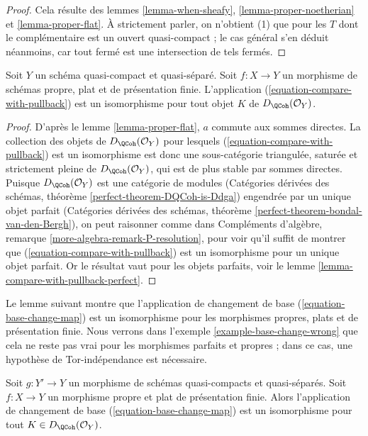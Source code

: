 \begin{proof}
Cela résulte des lemmes \ref{lemma-when-sheafy}, \ref{lemma-proper-noetherian} et \ref{lemma-proper-flat}. À strictement parler, on n'obtient (1) que pour les $T$ dont le complémentaire est un ouvert quasi-compact ; le cas général s'en déduit néanmoins, car tout fermé est une intersection de tels fermés.
\end{proof}

\begin{lemma}
\label{lemma-compare-with-pullback-flat-proper}
Soit $Y$ un schéma quasi-compact et quasi-séparé. Soit $f : X \to Y$ un morphisme de schémas propre, plat et de présentation finie. L'application (\ref{equation-compare-with-pullback}) est un isomorphisme pour tout objet $K$ de $D_\QCoh(\mathcal{O}_Y)$.
\end{lemma}

\begin{proof}
D'après le lemme \ref{lemma-proper-flat}, $a$ commute aux sommes directes. La collection des objets de $D_\QCoh(\mathcal{O}_Y)$ pour lesquels (\ref{equation-compare-with-pullback}) est un isomorphisme est donc une sous-catégorie triangulée, saturée et strictement pleine de $D_\QCoh(\mathcal{O}_Y)$, qui est de plus stable par sommes directes. Puisque $D_\QCoh(\mathcal{O}_Y)$ est une catégorie de modules (Catégories dérivées des schémas, théorème \ref{perfect-theorem-DQCoh-is-Ddga}) engendrée par un unique objet parfait (Catégories dérivées des schémas, théorème \ref{perfect-theorem-bondal-van-den-Bergh}), on peut raisonner comme dans Compléments d'algèbre, remarque \ref{more-algebra-remark-P-resolution}, pour voir qu'il suffit de montrer que (\ref{equation-compare-with-pullback}) est un isomorphisme pour un unique objet parfait. Or le résultat vaut pour les objets parfaits, voir le lemme \ref{lemma-compare-with-pullback-perfect}.
\end{proof}

\noindent
Le lemme suivant montre que l'application de changement de base (\ref{equation-base-change-map}) est un isomorphisme pour les morphismes propres, plats et de présentation finie. Nous verrons dans l'exemple \ref{example-base-change-wrong} que cela ne reste pas vrai pour les morphismes parfaits et propres ; dans ce cas, une hypothèse de Tor-indépendance est nécessaire.

\begin{lemma}
\label{lemma-proper-flat-base-change}
Soit $g : Y' \to Y$ un morphisme de schémas quasi-compacts et quasi-séparés. Soit $f : X \to Y$ un morphisme propre et plat de présentation finie. Alors l'application de changement de base (\ref{equation-base-change-map}) est un isomorphisme pour tout $K \in D_\QCoh(\mathcal{O}_Y)$.
\end{lemma}

